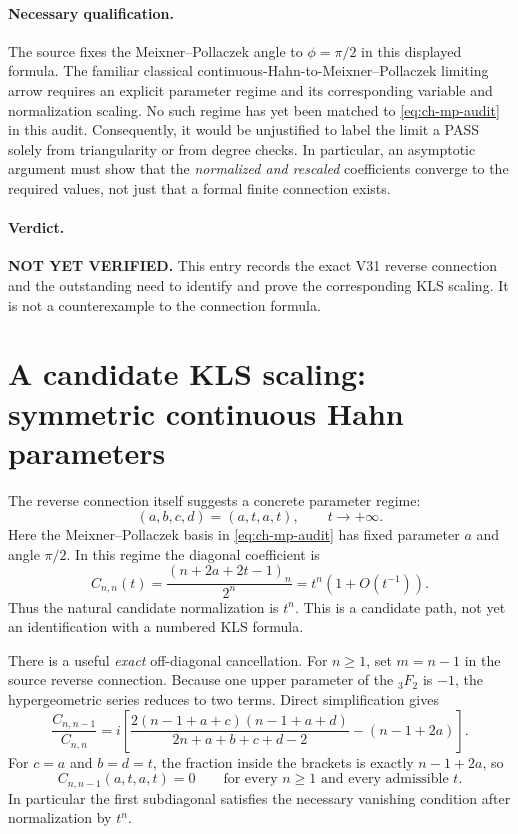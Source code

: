 \documentclass[11pt]{article}
\begin{document}
\paragraph{Necessary qualification.}
The source fixes the Meixner--Pollaczek angle to $\phi=\pi/2$ in this displayed formula. The familiar classical continuous-Hahn-to-Meixner--Pollaczek limiting arrow requires an explicit parameter regime and its corresponding variable and normalization scaling. No such regime has yet been matched to \eqref{eq:ch-mp-audit} in this audit. Consequently, it would be unjustified to label the limit a PASS solely from triangularity or from degree checks. In particular, an asymptotic argument must show that the \emph{normalized and rescaled} coefficients converge to the required values, not just that a formal finite connection exists.
\paragraph{Verdict.} \textbf{NOT YET VERIFIED.} This entry records the exact V31 reverse connection and the outstanding need to identify and prove the corresponding KLS scaling. It is not a counterexample to the connection formula.


\section{A candidate KLS scaling: symmetric continuous Hahn parameters}
The reverse connection itself suggests a concrete parameter regime:
\[
  (a,b,c,d)=(a,t,a,t),\qquad t\to+\infty.
\]
Here the Meixner--Pollaczek basis in \eqref{eq:ch-mp-audit} has fixed parameter $a$ and angle $\pi/2$. In this regime the diagonal coefficient is
\[
 C_{n,n}(t)=\frac{(n+2a+2t-1)_n}{2^n}=t^n(1+O(t^{-1})).
\]
Thus the natural candidate normalization is $t^n$. This is a candidate path, not yet an identification with a numbered KLS formula.

There is a useful \emph{exact} off-diagonal cancellation. For $n\ge1$, set $m=n-1$ in the source reverse connection. Because one upper parameter of the ${}_3F_2$ is $-1$, the hypergeometric series reduces to two terms. Direct simplification gives
\begin{equation}\label{eq:subdiag}
 \frac{C_{n,n-1}}{C_{n,n}}=
 i\left[\frac{2(n-1+a+c)(n-1+a+d)}{2n+a+b+c+d-2}-(n-1+2a)\right].
\end{equation}
For $c=a$ and $b=d=t$, the fraction inside the brackets is exactly $n-1+2a$, so
\[
 C_{n,n-1}(a,t,a,t)=0\qquad\text{for every }n\ge1\text{ and every admissible }t.
\]
In particular the first subdiagonal satisfies the necessary vanishing condition after normalization by $t^n$.
\end{document}
